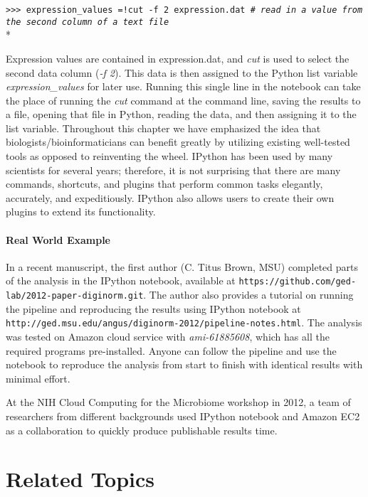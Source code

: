 \documentclass[ChapterTOCs,krantz2]{krantz} %
\begin{document}
\texttt{>>> expression\_values =!cut -f 2 expression.dat \emph{\# read in a
value from the second column of a text file}}\\*

Expression values are contained in expression.dat, and 
\emph{cut} is used to select the second data
column (\emph{-f 2}).  This data is then assigned to the Python list variable
\emph{expression\_values} for later use.  Running this single line in
the notebook can take the place of running the \emph{cut} command at the command line,
saving the results to a file, opening that file in Python, reading the data,
and then assigning it to the list variable.  Throughout this chapter we have
emphasized the idea that biologists/bioinformaticians can benefit greatly by
utilizing existing well-tested tools as opposed to reinventing the wheel.
IPython has been used by many scientists for several years; therefore, it is
not surprising that there are many commands, shortcuts, and plugins that
perform common tasks elegantly, accurately, and expeditiously.  
IPython also allows users to
create their own plugins to extend its functionality.

\paragraph{Real World Example}

In a recent manuscript, the first author (C. Titus Brown, MSU) completed parts
of the analysis in the IPython notebook, available at
\texttt{https://github.com/ged-lab/2012-paper-diginorm.git}. The author also
provides a tutorial on running the pipeline and reproducing the
results using IPython notebook at
\texttt{http://ged.msu.edu/angus/diginorm-2012/pipeline-notes.html}. 
The analysis was tested on Amazon cloud service with
\emph{ami-61885608}, which has all the required programs pre-installed. Anyone
can follow the pipeline and use the notebook to reproduce the
analysis from start to finish with identical results with minimal effort.

At the NIH Cloud Computing for the Microbiome workshop in 2012, a 
team of researchers from different backgrounds used IPython notebook 
and Amazon EC2 as a collaboration to quickly produce publishable results time\cite{RaganKelley2012}.

\section{Related Topics}
\end{document}
